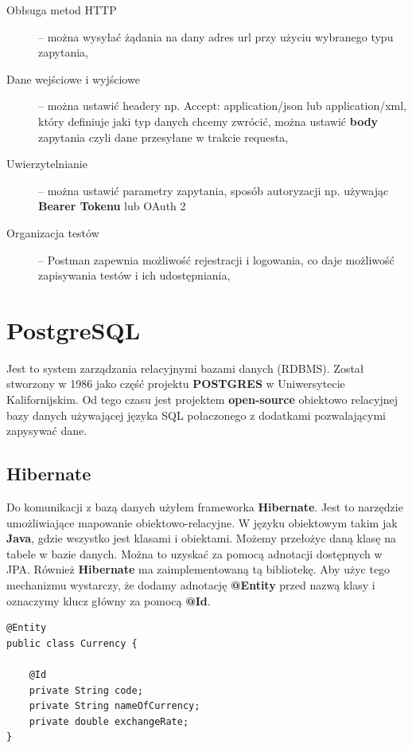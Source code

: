 \documentclass{iiuwb}
\begin{document}
\begin{description}
  \item[Obłsuga metod HTTP] -- można wysyłać żądania na dany adres url przy użyciu wybranego typu zapytania,
  \item[Dane wejściowe i wyjściowe] -- można ustawić headery np. Accept: application/json lub application/xml, który definiuje jaki typ danych chcemy zwrócić, można ustawić \textbf{body} zapytania czyli dane przesyłane w trakcie requesta,
  \item[Uwierzytelnianie] -- można ustawić parametry zapytania, sposób autoryzacji np. używając \textbf{Bearer Tokenu} lub OAuth 2
  \item[Organizacja testów] -- Postman zapewnia możliwość rejestracji i logowania, co daje możliwość zapisywania testów i ich udostępniania,
\end{description}

\section{PostgreSQL}
\label{sec:PostgreSQL}

Jest to system zarządzania relacyjnymi bazami danych (RDBMS). Został stworzony w 1986 jako część projektu \textbf{POSTGRES} w Uniwersytecie Kalifornijskim. Od tego czasu jest projektem \textbf{open-source} obiektowo relacyjnej bazy danych używającej języka SQL połaczonego z dodatkami pozwalającymi zapysywać dane.

\subsection{Hibernate}
\label{sec:Hibernate}

Do komunikacji z bazą danych użyłem frameworka \textbf{Hibernate}. Jest to narzędzie umożliwiające mapowanie obiektowo-relacyjne. W języku obiektowym takim jak \textbf{Java}, gdzie wszystko jest klasami i obiektami. Możemy przełożyc daną klasę na tabele w bazie danych. Można to uzyskać za pomocą adnotacji dostępnych w JPA. Również \textbf{Hibernate} ma zaimplementowaną tą bibliotekę. Aby użyc  tego mechanizmu wystarczy, że dodamy adnotację \textbf{@Entity} przed nazwą klasy i oznaczymy klucz główny za pomocą \textbf{@Id}.\newline

\begin{lstlisting}[breaklines=true]
@Entity
public class Currency {

    @Id
    private String code;
    private String nameOfCurrency;
    private double exchangeRate;
}
\end{lstlisting}
\end{document}
